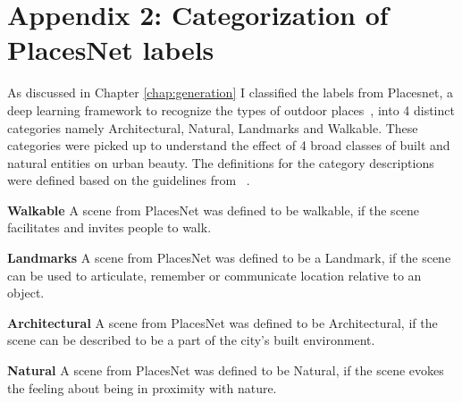 \chapter{Appendix 2: Categorization of PlacesNet labels}
\label{chap:app2}
As discussed in Chapter \ref{chap:generation} I classified the labels from Placesnet, a deep learning framework to recognize the types of outdoor places~\cite{zhou2014learning}, into 4 distinct categories namely Architectural, Natural, Landmarks and Walkable. These categories were picked up to understand the effect of 4 broad classes of built and natural entities on urban beauty. The definitions for the category descriptions were defined based on the guidelines from ~\cite{ewing2013measuring}.

\begin{definition}
    \textbf{Walkable} A scene from PlacesNet was defined to be walkable, if the scene facilitates and invites people to walk.
\end{definition}

\begin{definition}
    \textbf{Landmarks} A scene from PlacesNet was defined to be a Landmark, if the scene can be used to articulate, remember or communicate location relative to an object.
\end{definition}

\begin{definition}
    \textbf{Architectural} A scene from PlacesNet was defined to be Architectural, if the scene can be described to be a part of the city's built environment.
\end{definition}

\begin{definition}
    \textbf{Natural} A scene from PlacesNet was defined to be Natural, if the scene evokes the feeling about being in proximity with nature.
\end{definition}

